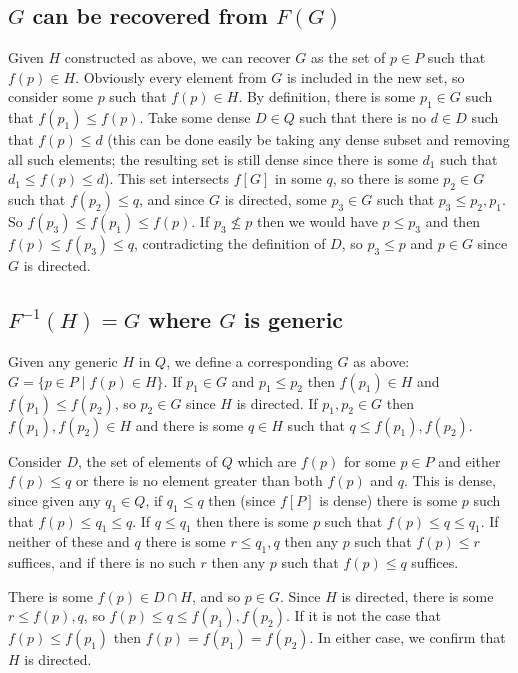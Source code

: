 \documentclass[12pt]{article}
\begin{document}
\subsection*{$G$ can be recovered from $F(G)$}
Given $H$ constructed as above, we can recover $G$ as the set of $p\in P$ such that $f(p)\in H$.  Obviously every element from $G$ is included in the new set, so consider some $p$ such that $f(p)\in H$.  By definition, there is some $p_1\in G$ such that $f(p_1)\leq f(p)$.  Take some dense $D\in Q$ such that there is no $d\in D$ such that $f(p)\leq d$ (this can be done easily be taking any dense subset and removing all such elements; the resulting set is still dense since there is some $d_1$ such that $d_1\leq f(p)\leq d$).  This set intersects $f[G]$ in some $q$, so there is some $p_2\in G$ such that $f(p_2)\leq q$, and since $G$ is directed, some $p_3\in G$ such that $p_3\leq p_2,p_1$.  So $f(p_3)\leq f(p_1)\leq f(p)$.  If $p_3\nleq p$ then we would have $p\leq p_3$ and then $f(p)\leq f(p_3)\leq q$, contradicting the definition of $D$, so $p_3\leq p$ and $p\in G$ since $G$ is directed.

\subsection*{$F^{-1}(H)=G$ where $G$ is generic}
Given any generic $H$ in $Q$, we define a corresponding $G$ as above: $G=\{p\in P\mid f(p)\in H\}$.  If $p_1\in G$ and $p_1\leq p_2$ then $f(p_1)\in H$ and $f(p_1)\leq f(p_2)$, so $p_2\in G$ since $H$ is directed.  If $p_1,p_2\in G$ then $f(p_1),f(p_2)\in H$ and there is some $q\in H$ such that $q\leq f(p_1),f(p_2)$.

Consider $D$, the set of elements of $Q$ which are $f(p)$ for some $p\in P$ and either $f(p)\leq q$ or there is no element greater than both $f(p)$ and $q$.  This is dense, since given any $q_1\in Q$, if $q_1\leq q$ then (since $f[P]$ is dense) there is some $p$ such that $f(p)\leq q_1\leq q$.  If $q\leq q_1$ then there is some $p$ such that $f(p)\leq q\leq q_1$.  If neither of these and $q$ there is some $r\leq q_1,q$ then any $p$ such that $f(p)\leq r$ suffices, and if there is no such $r$ then any $p$ such that $f(p)\leq q$ suffices.

There is some $f(p)\in D\cap H$, and so $p\in G$.  Since $H$ is directed, there is some $r\leq f(p),q$, so $f(p)\leq q\leq f(p_1),f(p_2)$.  If it is not the case that $f(p)\leq f(p_1)$ then $f(p)=f(p_1)=f(p_2)$.  In either case, we confirm that $H$ is directed.
\end{document}
